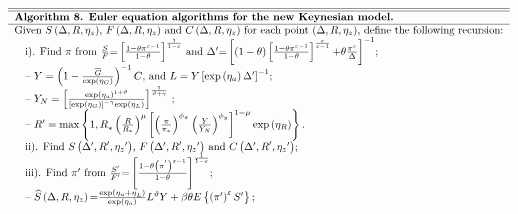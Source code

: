 \begin{equation*}
\begin{tabular}{l}
\hline \hline
\textbf{Algorithm 8. Euler equation algorithms for the new Keynesian model. }
\\ \hline
Given $S\left( {\Delta ,R,\eta _z }\right) $, $F\left( {\Delta ,R,\eta _z }\right)
$ and $C\left( {\Delta ,R,\eta _z }\right) $ for each point $\left( {\Delta
,R,\eta _z }\right) $, define the following recursion: \\

\quad i). Find ${\pi }$ {from} $\frac{{S}}{{F}}{=}\left[ \frac{{1-\theta \pi
}^{\varepsilon -1}}{{1-\theta }}\right] ^{\frac{1}{1-\varepsilon }}${\ and }$
{\Delta }^{\prime }{=}\left[ \left( {1-\theta }\right) \left[ \frac{{
1-\theta \pi }^{\varepsilon -1}}{{1-\theta }}\right] ^{\frac{\varepsilon }{
\varepsilon -1}}{+\theta }\frac{{\pi }^{\varepsilon }}{{\Delta }}\right] ^{{
-1}}${;} \\

\quad -- ${Y}=\left( {1}-\frac{\overline{G}}{\exp \left( \eta _{G}\right) }
\right) ^{{-1}}{C}${, and }${L}={Y}\left[ {\exp }\left( {\eta }_{{a}}\right)
{\Delta }^{{\prime }}\right] ^{-1}${;} \\
\quad --{\ }${Y}_{{N}}=\left[ \frac{{\exp }\left( {\eta }_{a}\right)
^{1+\vartheta }}{\left[ {\exp }\left( {\eta }_{{G}}\right) \right] ^{-\gamma
}{\exp }\left( {\eta }_{{L}}\right) }\right] ^{\frac{1}{\vartheta +\gamma }}$
{;} \\

{\quad }--{\ }${R}^{{\prime }}={\max }\left \{ {1,R}_{\ast }\left( \frac{R}{
R_{\ast }}\right) ^{{\mu }}\left[ \left( \frac{\pi }{\pi _{\ast }}\right) ^{{
\phi }_{\pi }}\left( \frac{Y}{Y_{N}}\right) ^{{\phi }_{y}}\right] ^{{1-\mu }}
{\exp }\left( {\eta }_{{R}}\right) \right \} .$ \\

\quad ii). Find $S\left( {\Delta }^{\prime }{,R}^{\prime }{,\eta_z }^{\prime
}\right) $, $F\left( {\Delta }^{\prime }{,R}^{\prime }{,\eta_z }^{\prime
}\right) $ and $C\left( {\Delta }^{\prime }{,R}^{\prime }{,\eta_z }^{\prime
}\right) ${;} \\

\quad iii). Find ${\pi }^{{\prime }}${\ from }$\frac{{S}^{\prime }}{{F}
^{\prime }}{=}\left[ \frac{{1-\theta }\left( \pi ^{^{\prime }}\right)
^{\varepsilon -1}}{{1-\theta }}\right] ^{\frac{{1}}{{1-\varepsilon }}}${;}
\\

\quad -- $\widehat{{S}}\left( {\Delta ,R,\eta_z }\right) {=}\frac{{\exp }
\left( {\eta }_{{u}}{+\eta }_{{L}}\right) }{{\exp }\left( {\eta }_{{a}
}\right) }{L}^{{\vartheta }}{Y+\beta \theta }E\left \{ \left( {\pi }^{{
\prime }}\right) ^{{\varepsilon }}{S}^{{\prime }}\right \} ;$ \\


\end{tabular}
\end{equation*}
